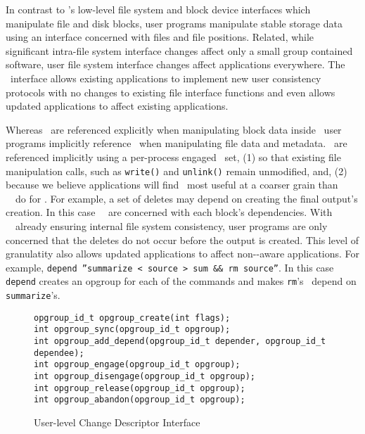 In contrast to \Kudos{}'s low-level file system and block device
interfaces which manipulate file and disk blocks, user programs
manipulate stable storage data using an interface concerned with files
and file positions.
%
Related, while significant intra-file system interface changes affect
only a small group contained software, user file system interface
changes affect applications everywhere. The \opgroup\ interface allows
existing applications to implement new user consistency protocols
with no changes to existing file interface functions and even allows
updated applications to affect existing applications.

Whereas \chdescs\ are referenced explicitly when manipulating block
data inside \Kudos\, user programs implicitly reference \opgroups\
when manipulating file data and metadata. \Opgroups\ are referenced
implicitly using a per-process engaged \opgroup\ set,
%
(1) so that existing file manipulation calls, such as \verb+write()+
and \verb+unlink()+ remain unmodified, and,
%
(2) because we believe applications will find \opgroups\ most useful
at a coarser grain than \Kudos\ \modules\ do for \chdescs. For
example, a set of deletes may depend on creating the final output's
creation. In this case \Kudos\ \modules\ are concerned with each
block's dependencies. With \Kudos\ \modules\ already ensuring internal
file system consistency, user programs are only concerned that the
deletes do not occur before the output is created. This level of
granulatity also allows updated applications to affect
non-\opgroup{}-aware applications. For example,
\texttt{depend ''summarize < source > sum \&\& rm source''}. In this case
\texttt{depend} creates an opgroup for each of the commands and makes
\texttt{rm}'s \opgroup\ depend on \texttt{summarize}'s.

\begin{figure}[htb]
\begin{scriptsize}
\texttt{opgroup\_id\_t opgroup\_create(int flags);}\\
\texttt{int opgroup\_sync(opgroup\_id\_t opgroup);}\\
\texttt{int opgroup\_add\_depend(opgroup\_id\_t depender, opgroup\_id\_t dependee);}\\
\texttt{int opgroup\_engage(opgroup\_id\_t opgroup);}\\
\texttt{int opgroup\_disengage(opgroup\_id\_t opgroup);}\\
\texttt{int opgroup\_release(opgroup\_id\_t opgroup);}\\
\texttt{int opgroup\_abandon(opgroup\_id\_t opgroup);}
\end{scriptsize}
\caption{\label{fig:opgroup-interface} User-level Change Descriptor Interface}
\end{figure}

